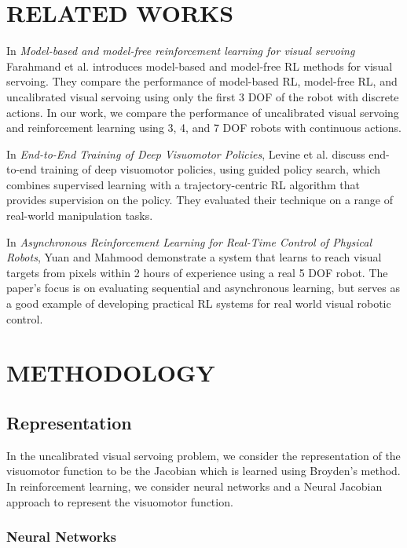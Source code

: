 \documentclass[letterpaper, 10 pt, conference]{ieeeconf}  %
\begin{document}
\section{RELATED WORKS} \label{Related Works} In \emph{Model-based and model-free
reinforcement learning for visual servoing} Farahmand et al. introduces
model-based and model-free RL methods for visual servoing. \cite{Farahmand2009}
They compare the performance of model-based RL, model-free RL, and uncalibrated
visual servoing using only the first 3 DOF of the robot with discrete actions.
In our work, we compare the performance of uncalibrated visual servoing and
reinforcement learning using 3, 4, and 7 DOF robots with continuous actions.

In \emph{End-to-End Training of Deep Visuomotor Policies}, Levine et al. discuss
end-to-end training of deep visuomotor policies, using guided policy search,
which combines supervised learning with a trajectory-centric RL algorithm that
provides supervision on the policy. They evaluated their technique on a range of
real-world manipulation tasks.
\cite{Levine15}

In \emph{Asynchronous Reinforcement Learning for Real-Time Control of Physical
Robots}, Yuan and Mahmood demonstrate a system that learns to reach visual
targets from pixels within 2 hours of experience using a real 5 DOF robot.
\cite{Yuan2022} The paper's focus is on evaluating sequential and asynchronous
learning, but serves as a good example of developing practical RL systems for
real world visual robotic control.


\section{METHODOLOGY} \label{Methodology}

\subsection{Representation}

In the uncalibrated visual servoing problem, we consider
the representation of the visuomotor function to be the Jacobian which
is learned using Broyden's method. In reinforcement learning, we consider
neural networks and a Neural Jacobian approach to represent the visuomotor
function.

\subsubsection{Neural Networks}
\end{document}
